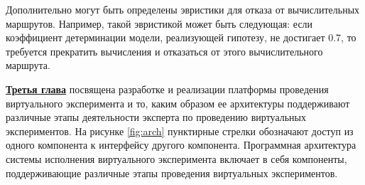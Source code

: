 Дополнительно могут быть определены эвристики для отказа от вычислительных маршрутов. Например, такой эвристикой может 
быть следующая: если коэффициент детерминации модели, реализующей гипотезу, не достигает 0.7, то требуется прекратить
вычисления и отказаться от этого вычислительного маршрута.





            



\underline{\textbf{Третья глава}} посвящена разработке и реализации платформы проведения виртуального 
эксперимента и то, каким образом ее архитектуры поддерживают различные этапы деятельности эксперта 
по проведению виртуальных экспериментов. На рисунке \cref{fig:arch} пунктирные стрелки обозначают доступ из одного 
компонента к интерфейсу другого компонента. Программная 
архитектура системы исполнения виртуального эксперимента включает в себя компоненты, поддерживающие различные этапы 
проведения виртуальных экспериментов. 

